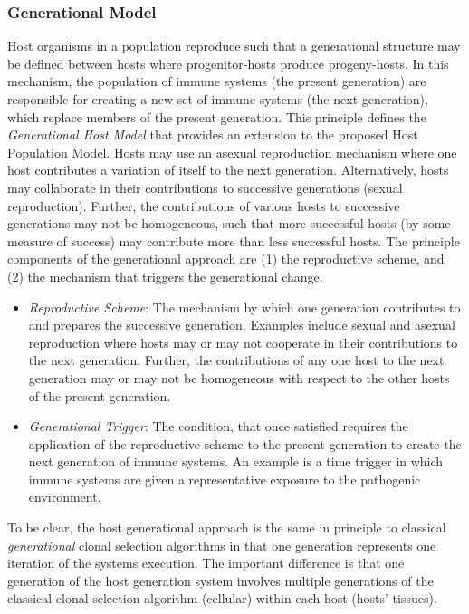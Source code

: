 %
%
\subsubsection{Generational Model}
Host organisms in a population reproduce such that a generational structure may be defined between hosts where progenitor-hosts produce progeny-hosts. In this mechanism, the population of immune systems (the present generation) are responsible for creating a new set of immune systems (the next generation), which replace members of the present generation. This principle defines the \emph{Generational Host Model} that provides an extension to the proposed Host Population Model. Hosts may use an asexual reproduction mechanism where one host contributes a variation of itself to the next generation. Alternatively, hosts may collaborate in their contributions to successive generations (sexual reproduction). Further, the contributions of various hosts to successive generations may not be homogeneous, such that more successful hosts (by some measure of success) may contribute more than less successful hosts.
The principle components of the generational approach are (1) the reproductive scheme, and (2) the mechanism that triggers the generational change.

\begin{itemize}
	\item \emph{Reproductive Scheme}: The mechanism by which one generation contributes to and prepares the successive generation. Examples include sexual and asexual reproduction where hosts may or may not cooperate in their contributions to the next generation. Further, the contributions of any one host to the next generation may or may not be homogeneous with respect to the other hosts of the present generation.
	\item \emph{Generational Trigger}: The condition, that once satisfied requires the application of the reproductive scheme to the present generation to create the next generation of immune systems. An example is a time trigger in which immune systems are given a representative exposure to the pathogenic environment.
\end{itemize}

To be clear, the host generational approach is the same in principle to classical \emph{generational} clonal selection algorithms in that one generation represents one iteration of the systems execution. The important difference is that one generation of the host generation system involves multiple generations of the classical clonal selection algorithm (cellular) within each host (hosts' tissues).

